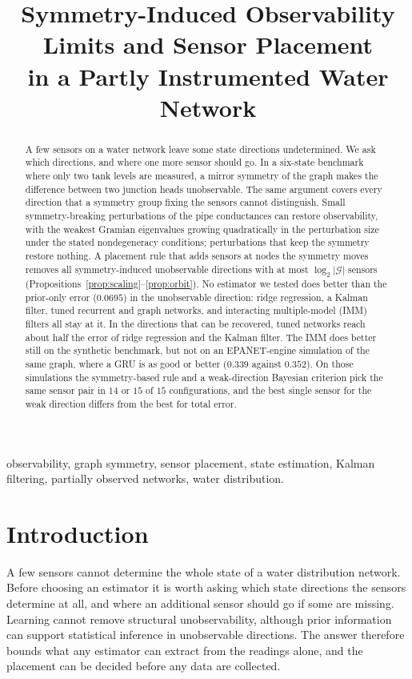 \documentclass[conference]{IEEEtran}
\title{Symmetry-Induced Observability Limits and Sensor Placement\\in a Partly Instrumented Water Network}
\author{
\IEEEauthorblockN{Authors to be supplied}
\IEEEauthorblockA{Affiliation to be supplied}
}
\begin{document}
\maketitle

\begin{abstract}
A few sensors on a water network leave some state directions undetermined. We ask which directions, and where one more sensor should go. In a six-state benchmark where only two tank levels are measured, a mirror symmetry of the graph makes the difference between two junction heads unobservable. The same argument covers every direction that a symmetry group fixing the sensors cannot distinguish. Small symmetry-breaking perturbations of the pipe conductances can restore observability, with the weakest Gramian eigenvalues growing quadratically in the perturbation size under the stated nondegeneracy conditions; perturbations that keep the symmetry restore nothing. A placement rule that adds sensors at nodes the symmetry moves removes all symmetry-induced unobservable directions with at most $\log_2|\mathcal G|$ sensors (Propositions~\ref{prop:scaling}--\ref{prop:orbit}). No estimator we tested does better than the prior-only error ($0.0695$) in the unobservable direction: ridge regression, a Kalman filter, tuned recurrent and graph networks, and interacting multiple-model (IMM) filters all stay at it. In the directions that can be recovered, tuned networks reach about half the error of ridge regression and the Kalman filter. The IMM does better still on the synthetic benchmark, but not on an EPANET-engine simulation of the same graph, where a GRU is as good or better ($0.339$ against $0.352$). On those simulations the symmetry-based rule and a weak-direction Bayesian criterion pick the same sensor pair in $14$ or $15$ of $15$ configurations, and the best single sensor for the weak direction differs from the best for total error.
\end{abstract}

\begin{IEEEkeywords}
observability, graph symmetry, sensor placement, state estimation, Kalman filtering, partially observed networks, water distribution.
\end{IEEEkeywords}

\section{Introduction}

A few sensors cannot determine the whole state of a water distribution network. Before choosing an estimator it is worth asking which state directions the sensors determine at all, and where an additional sensor should go if some are missing. Learning cannot remove structural unobservability, although prior information can support statistical inference in unobservable directions. The answer therefore bounds what any estimator can extract from the readings alone, and the placement can be decided before any data are collected.
\end{document}
